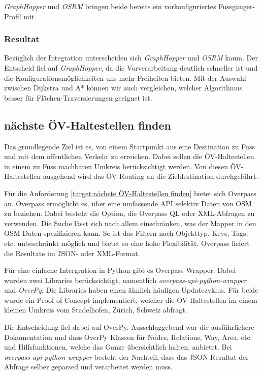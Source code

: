 \emph{GraphHopper} und \emph{OSRM} bringen beide bereits ein vorkonfiguriertes Fussgänger-Profil mit.

\subsubsection{Resultat}
\label{analyse:Resulat}
Bezüglich der Integration unterscheiden sich \emph{GraphHopper} und \emph{OSRM} kaum. Der Entscheid fiel auf \emph{GraphHopper}, da die Vorverarbeitung deutlich schneller ist und die Konfigurationsmöglichkeiten uns mehr Freiheiten bieten. Mit der Auswahl zwischen Dijkstra \cite{dijkstra_algorithm} und A* \cite{astar} können wir auch vergleichen, welcher Algorithmus besser für Flächen-Traversierungen geeignet ist.


\subsection{nächste ÖV-Haltestellen finden}
\label{analyse:nächste ÖV-Haltestellen finden}

Das grundlegende Ziel ist es, von einem Startpunkt aus eine Destination zu Fuss und mit dem öffentlichen Verkehr zu erreichen. Dabei sollen die ÖV-Haltestellen in einem zu Fuss machbaren Umkreis berücksichtigt werden. Von diesen ÖV-Haltestellen ausgehend wird das ÖV-Routing an die Zieldestination durchgeführt.

Für die Anforderung \ref{target:nächste ÖV-Haltestellen finden} bietet sich Overpass an. Overpass ermöglicht es, über eine umfassende \ac{API} selektiv Daten von \ac{OSM} zu beziehen. Dabei besteht die Option, die Overpass \ac{QL} oder XML-Abfragen zu verwenden. Die Suche lässt sich nach allem einschränken, was der Mapper in den \ac{OSM}-Daten spezifizieren kann. So ist das Filtern nach Objekttyp, Keys, \glspl{Tag}, etc. unbeschränkt möglich und bietet so eine hohe Flexibilität. Overpass liefert die Resultate im JSON- oder XML-Format. 

Für eine einfache Intergration in Python gibt es Overpass Wrapper. Dabei wurden zwei Libraries berücksichtigt, namentlich \emph{overpass-api-python-wrapper} und \emph{OverPy}. Die Libraries haben einen ähnlich häufigen Updatezyklus. Für beide wurde ein Proof of Concept implementiert, welcher die ÖV-Haltestellen im einem kleinen Umkreis vom Stadelhofen, Zürich, Schweiz abfragt.

Die Entscheidung fiel dabei auf OverPy. Ausschlaggebend war die ausführlichere Dokumentation und dass OverPy Klassen für \glspl{Node}, Relations, \gls{Way}, Area, etc. und Hilfsfunktionen, welche das Ganze übersichtlich halten, anbietet. Bei \emph{overpass-api-python-wrapper} besteht der Nachteil, dass das JSON-Resultat der Abfrage selber geparsed und verarbeitet werden muss.

